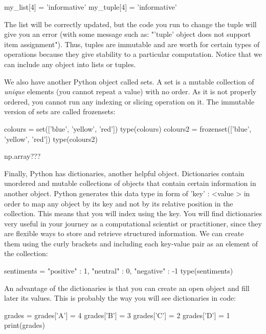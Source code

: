 \begin{examplepy}
my_list[4] = 'informative'
my_tuple[4] = 'informative'
\end{examplepy}

The list will be correctly updated, but the code you run to change the tuple will give you an error (with some message such as: "'tuple' object does not support item assignment"). Thus, tuples are immutable and are worth for certain types of operations because they give stability to a particular computation. Notice that we can include any object into lists or tuples. 

We also have another Python object called sets. A set is a mutable collection of \emph{unique} elements (you cannot repeat a value) with no order. As it is not properly ordered, you cannot run any indexing or slicing operation on it. The immutable version of sets are called frozensets:

\begin{examplepy}
colours = set(['blue', 'yellow', 'red'])
type(colours)
colours2 = frozenset(['blue', 'yellow', 'red'])
type(colours2)
\end{examplepy}



np.array???


Finally, Python has dictionaries, another helpful object.	 Dictionaries contain unordered and mutable collections of objects that contain certain information in another object. Python generates this data type in form of { 'key' : \textless value \textgreater} in order to map any object by its key and not by its relative position in the collection. This means that you will index using the key. You will find dictionaries very useful in your journey as a computational scientist or practitioner, since they are flexible ways to store and retrieve structured information. We can create them using the curly brackets {} and including each key-value pair as an element of the collection:

\begin{examplepy}
sentiments = {"positive" : 1, "neutral" : 0, "negative" : -1}
type(sentiments)
\end{examplepy}

An advantage of the dictionaries is that you can create an open object and fill later its values. This is probably the way you will see dictionaries in code:

\begin{examplepy}
grades =  {}
grades['A'] = 4
grades['B'] = 3
grades['C'] = 2
grades['D'] = 1
print(grades)
\end{examplepy}

